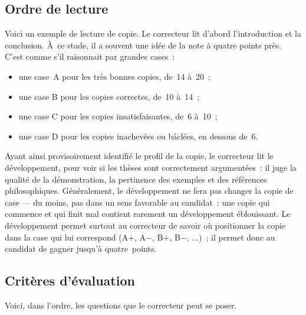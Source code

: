 \documentclass[a4paper,11pt]{article}
\begin{document}
\par


\subsection{Ordre de lecture}

Voici un exemple de lecture de copie. Le correcteur lit d'abord
l'introduction et la conclusion. À~ce stade, il a souvent une idée de la
note à quatre points près. C'est comme s'il raisonnait par grandes
cases~:
\begin{itemize}
\item une case~A pour les très bonnes copies, de~14 à~20~;
\item une case B pour les copies correctes, de~10 à~14~;
\item une case C pour les copies insatisfaisantes, de~6 à~10~;
\item une case D pour les copies inachevées ou bâclées, en dessous
  de~6.
\end{itemize}

\par

Ayant ainsi provisoirement identifié le profil de la copie, le
correcteur lit le développement, pour voir si les thèses sont
correctement argumentées~: il juge la qualité de la démonstration, la
pertinence des exemples et des références philosophiques. Généralement,
le développement ne fera pas changer la copie de case --- du moins, pas
dans un sens favorable au candidat~: une copie qui commence et qui finit
mal contient rarement un développement éblouissant. Le développement
permet surtout au correcteur de savoir où positionner la copie dans la
case qui lui correspond (A$+$, A$-$, B$+$, B$-$, ...)~; il permet donc
au candidat de gagner jusqu'à quatre~points.

\par


\subsection{Critères d'évaluation}

Voici, dans l'ordre, les questions que le correcteur peut se poser.
\end{document}

